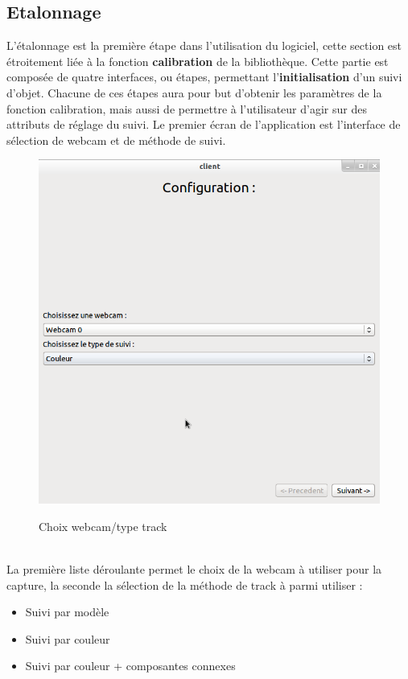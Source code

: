 \documentclass{report}
\begin{document}
			\subsection{Etalonnage}
				L'étalonnage est la première étape dans l'utilisation du logiciel, cette section est étroitement liée à la fonction \textbf{calibration} de la bibliothèque. Cette partie est composée de quatre interfaces, ou étapes, permettant l'\textbf{initialisation} d'un suivi d'objet. Chacune de ces étapes aura pour but d'obtenir les paramètres de la fonction calibration, mais aussi de permettre à l'utilisateur d'agir sur des attributs de réglage du suivi.
				\newpage
				Le premier écran de l'application est l'interface de sélection de webcam et de méthode de suivi.\\
				\begin{figure}[!h]
						\centering
						\includegraphics[scale=0.38]{../images/Capture6.png}\\
						\caption{Choix webcam/type track}
						\label{Choix webcam/type track}
				\end{figure}\\
				La première liste déroulante permet le choix de la webcam à utiliser pour la capture, la seconde la sélection de la méthode de track à parmi utiliser :
				\begin{itemize}
					\item Suivi par modèle
					\item Suivi par couleur
					\item Suivi par couleur + composantes connexes
				\end{itemize}
\end{document}
